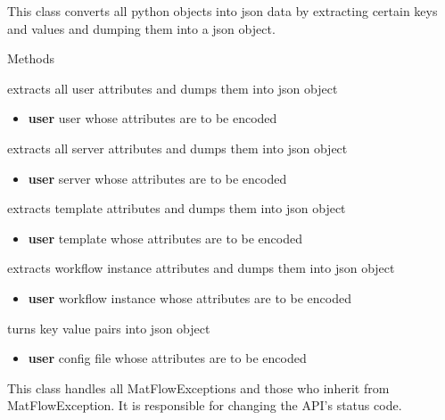 This class converts all python objects into json data by extracting certain keys and values and dumping
them into a json object.

\begin{methodenv}{Methods}

extracts all user attributes and dumps them into json object
\begin{itemize}
        \item \textbf{user}
        user whose attributes are to be encoded
\end{itemize}

extracts all server attributes and dumps them into json object
\begin{itemize}
        \item \textbf{user}
        server whose attributes are to be encoded
\end{itemize}

extracts template attributes and dumps them into json object
\begin{itemize}
        \item \textbf{user}
        template whose attributes are to be encoded
\end{itemize}

extracts workflow instance attributes and dumps them into json object
\begin{itemize}
        \item \textbf{user}
        workflow instance whose attributes are to be encoded
\end{itemize}

turns key value pairs into json object
\begin{itemize}
        \item \textbf{user}
        config file whose attributes are to be encoded
\end{itemize}

\end{methodenv}

This class handles all MatFlowExceptions and those who inherit from MatFlowException. It is  
responsible for changing the API's status code.

